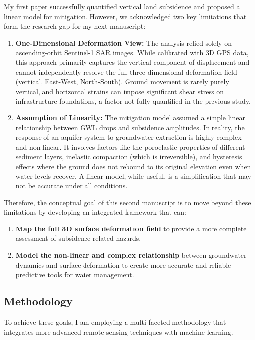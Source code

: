 \documentclass[12pt, a4paper]{article}
\begin{document}
	My first paper successfully quantified vertical land subsidence and proposed a linear model for mitigation. However, we acknowledged two key limitations that form the research gap for my next manuscript:
	
	\begin{enumerate}
		\item \textbf{One-Dimensional Deformation View:} The analysis relied solely on ascending-orbit Sentinel-1 SAR images. While calibrated with 3D GPS data, this approach primarily captures the vertical component of displacement and cannot independently resolve the full three-dimensional deformation field (vertical, East-West, North-South). Ground movement is rarely purely vertical, and horizontal strains can impose significant shear stress on infrastructure foundations, a factor not fully quantified in the previous study.
		\item \textbf{Assumption of Linearity:} The mitigation model assumed a simple linear relationship between GWL drops and subsidence amplitudes. In reality, the response of an aquifer system to groundwater extraction is highly complex and non-linear. It involves factors like the poroelastic properties of different sediment layers, inelastic compaction (which is irreversible), and hysteresis effects where the ground does not rebound to its original elevation even when water levels recover. A linear model, while useful, is a simplification that may not be accurate under all conditions.
	\end{enumerate}
	
	Therefore, the conceptual goal of this second manuscript is to move beyond these limitations by developing an integrated framework that can:
	\begin{enumerate}
		\item \textbf{Map the full 3D surface deformation field} to provide a more complete assessment of subsidence-related hazards.
		\item \textbf{Model the non-linear and complex relationship} between groundwater dynamics and surface deformation to create more accurate and reliable predictive tools for water management.
	\end{enumerate}
	
	\subsection{Methodology}
	
	To achieve these goals, I am employing a multi-faceted methodology that integrates more advanced remote sensing techniques with machine learning.
	
\end{document}
